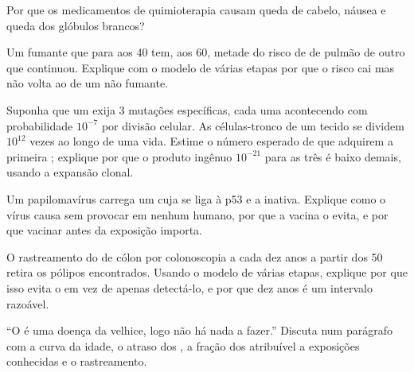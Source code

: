 \begin{exercise}[$\star\star$]\label{exo:g11:cancer:10}
Por que os medicamentos de quimioterapia causam queda de cabelo, náusea
e queda dos glóbulos brancos?
\end{exercise}

\begin{exercise}[$\star\star$]\label{exo:g11:cancer:11}
Um fumante que para aos 40 tem, aos 60, metade do risco de  de
pulmão de outro que continuou. Explique com o modelo de várias etapas
por que o risco cai mas não volta ao de um não fumante.
\end{exercise}

\begin{exercise}[$\star\star\star$]\label{exo:g11:cancer:12}
Suponha que um  exija 3 mutações específicas, cada uma
acontecendo com probabilidade $10^{-7}$ por divisão celular. As
células-tronco de um tecido se dividem $10^{12}$ vezes ao longo de uma
vida. Estime o número esperado de  que adquirem a primeira
; explique por que o produto ingênuo $10^{-21}$ para as três é
baixo demais, usando a expansão clonal.
\end{exercise}

\begin{exercise}[$\star\star\star$]\label{exo:g11:cancer:13}
Um papilomavírus carrega um  cuja  se liga à p53 e a
inativa. Explique como o vírus causa  sem provocar  em
nenhum  humano, por que a vacina o evita, e por que vacinar antes
da exposição importa.
\end{exercise}

\begin{exercise}[$\star\star\star$]\label{exo:g11:cancer:14}
O rastreamento do  de cólon por colonoscopia a cada dez anos a
partir dos 50 retira os pólipos encontrados. Usando o modelo de várias
etapas, explique por que isso evita o  em vez de apenas detectá-lo,
e por que dez anos é um intervalo razoável.
\end{exercise}

\begin{exercise}[$\star\star\star$]\label{exo:g11:cancer:15}
``O  é uma doença da velhice, logo não há nada a fazer.'' Discuta
num parágrafo com a curva da idade, o atraso dos , a fração
dos  atribuível a exposições conhecidas e o rastreamento.
\end{exercise}

